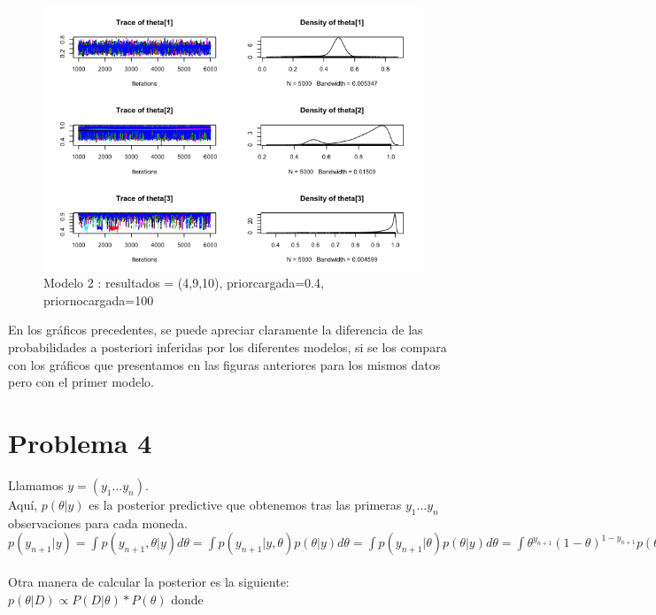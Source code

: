 \documentclass[a4paper]{article}
\begin{document}
\begin{figure}[h!]
\centering
\includegraphics[scale=0.5] {img6.png}
\caption{ Modelo 2 : resultados = (4,9,10), priorcargada=0.4, priornocargada=100 }
\end{figure}

En los gráficos precedentes, se puede apreciar claramente la diferencia de las probabilidades
a posteriori inferidas por los diferentes modelos, si se los compara con los 
gráficos que presentamos en las figuras anteriores para los mismos datos pero con el 
primer modelo.

\newpage
\section {Problema 4}
Llamamos $ y = ( y_1 \dots y_n ) $. \\

Aquí, $ p(\theta | y) $ es la posterior predictive que obtenemos tras las primeras
$ y_1 \dots y_n $ observaciones para cada moneda. \\

$ 
p(y_{n+1} | y) =  \int p(y_{n+1}, \theta | y) d\theta 
			   =  \int p(y_{n+1} | y, \theta) p(\theta | y) d \theta
			   =  \int p(y_{n+1} | \theta) p(\theta | y) d \theta
			   =  \int \theta^{y_{n+1}} (1 - \theta)^{1 - y_{n+1}} p(\theta | y) d \theta
$
\\
\\
Otra manera de calcular la posterior es la siguiente:
\\

$ p(\theta | D) \propto P(D | \theta) * P(\theta) $ donde \\
\end{document}
